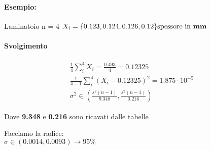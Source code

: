 \documentclass[]{article}
\begin{document}
    \paragraph{Esempio:} Laminatoio n = 4
    $X_i = \{ 0.123, 0.124, 0.126, 0.12 \} \text{spessore in \textbf{mm}}$ \\
    \paragraph{Svolgimento}
    \begin{equation*}
        \begin{aligned}
            \frac{1}{4} \sum_{i}^{4} X_i = \frac{0.493}{4} = 0.12325 \\
            \frac{1}{4-1} \sum_{i}^{4}\left ( X_i - 0.12325 \right )^2 = 1.875 \cdot 10^{-5} \\
            \sigma^2 \in \left ( \frac{s^2(n-1)}{9.348}, \frac{s^2(n-1)}{0.216} \right )
        \end{aligned} 
    \end{equation*}
    \centerline{Dove \textbf{9.348} e \textbf{0.216} sono ricavati dalle tabelle}
    Facciamo la radice: \\
    $\sigma \in (0.0014, 0.0093) \rightarrow 95\% $
\end{document}
